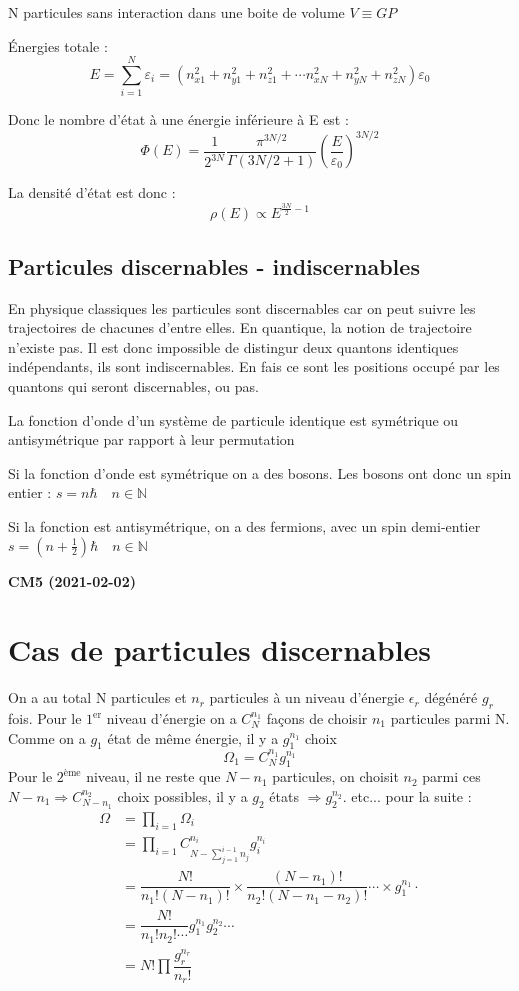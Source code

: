 \documentclass[12pt,a4paper]{report}
\newcommand{\ens}[1]{\mathbb{#1}}
\begin{document}
N particules sans interaction dans une boite de volume \( V \equiv GP\)

Énergies totale :
\[
	E = \sum_{i = 1}^N \varepsilon_i = (n_{x1}^2 + n_{y1}^2 + n_{z1}^2 + \cdots n_{xN}^2 + n_{yN}^2 + n_{zN}^2)\varepsilon_0
\]

Donc le nombre d'état à  une énergie inférieure à E est :
\[
	\Phi(E) = \dfrac{1}{2^{3N}} \dfrac{\pi^{3N/2}}{\Gamma(3N/2 + 1)} \left( \dfrac{E}{\varepsilon_0}\right)^{3N/2}
\]

La densité d'état est donc :
\[
	\rho(E) \propto E^{\frac{3N}{2} - 1}
\]

\subsection{Particules discernables - indiscernables}

En physique classiques les particules sont discernables car on peut suivre les trajectoires de chacunes d'entre elles.
En quantique, la notion de trajectoire n'existe pas.
Il est donc impossible de distingur deux quantons identiques indépendants, ils sont indiscernables.
En fais ce sont les positions occupé par les quantons qui seront discernables, ou pas.

La fonction d'onde d'un système de particule identique est symétrique ou antisymétrique par rapport à leur permutation

Si la fonction d'onde est symétrique on a des bosons.
Les bosons ont donc un spin entier : \(s = n \hbar \quad  n \in \ens{N}\)

Si la fonction est antisymétrique, on a des fermions, avec un spin demi-entier \(s = (n + \frac{1}{2}) \hbar \quad n \in \ens{N}\)

\begin{center}
\textbf{CM5 (2021-02-02)}
\end{center}

\section{Cas de particules discernables}

On a au total N particules et $n_r$ particules à un niveau d'énergie $\epsilon_r$ dégénéré $g_r$ fois.
Pour le $1^{\text{er}}$ niveau d'énergie on a $C_N^{n_1}$ façons de choisir $n_1$ particules parmi N.
Comme on a $g_1$ état de même énergie, il y a $g_1^{n_1}$ choix
\[
	\Omega_1 = C_N^{n_1} g_1^{n_1}
\]
Pour le $2^{\text{ème}}$ niveau, il ne reste que $N - n_1$ particules, on choisit $n_2$ parmi ces $N - n_1 \Rightarrow C_{N-n_1}^{n_2}$ choix possibles, il y a $g_2$ états $\Rightarrow g_2^{n_2}$.
etc... pour la suite :
\begin{align*}
	\Omega &= \prod_{i=1} \Omega_i\\
	&= \prod_{i=1} C_{N-\sum_{j=1}^{i-1} n_j}^{n_i} g_i^{n_i}\\
	&= \dfrac{N!}{n_1!(N-n_1)!} \times \dfrac{(N-n_1)!}{n_2!(N-n_1-n_2)!}\cdots \times g_1^{n_1} \cdot\\
	&= \dfrac{N!}{n_1!n_2! \cdots} g_1^{n_1}g_2^{n_2} \cdots\\
	&= N! \prod \dfrac{g_r^{n_r}}{n_r!}
\end{align*}
\end{document}
